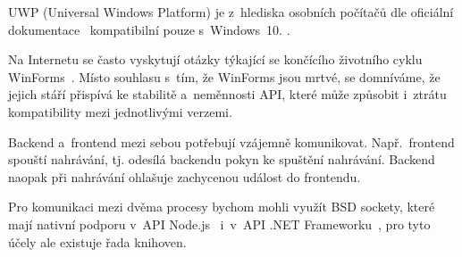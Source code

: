 \documentclass[12pt, a4paper, twoside]{article}
\begin{document}
\begin{enumerate}[leftmargin=*]
{			UWP (Universal Windows Platform) je z~hlediska osobních počítačů dle oficiální dokumentace~\cite{uwpSupportedPlatforms} kompatibilní pouze s~Windows~10.
		}. 
		
		
		Na Internetu se často vyskytují otázky týkající se končícího životního cyklu WinForms~\cite{winformObselote1,winformsObselote2,winformsObselote3, winformsObselote4, winformsObselote5}. Místo souhlasu s~tím, že WinForms jsou mrtvé, se domníváme, že jejich stáří přispívá ke stabilitě a~neměnnosti API, které může způsobit i~ztrátu kompatibility mezi jednotlivými verzemi.
		
	\end{enumerate}
	Backend a~frontend mezi sebou potřebují vzájemně komunikovat. Např.~frontend spouští nahrávání, tj. odesílá backendu pokyn ke spuštění nahrávání. Backend naopak při nahrávání ohlašuje zachycenou událost do frontendu. 
	
	Pro komunikaci mezi dvěma procesy bychom mohli využít BSD sockety, které mají nativní podporu v~API Node.js~\cite{nodejsApi} i~v~API .NET Frameworku~\cite{dotnetApi}, pro tyto účely ale existuje řada knihoven. 
	
\end{document}
